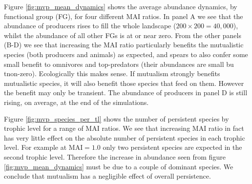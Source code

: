
Figure \ref{fig:mvp_mean_dynamics} shows the average abundance dynamics, by functional group (FG), for four different MAI ratios. In panel A we see that the abundance of producers rises to fill the whole landscape ($200 \times 200=40,000$), whilst the abundance of all other FGs is at or near zero. From the other panels (B-D) we see that increasing the MAI ratio particularly benefits the mutualistic species (both producers and animals) as expected, and spears to also confer some small benefit to omnivores and top-predators (their abundances are small bu tnon-zero). Ecologically this makes sense. If mutualism strongly benefits mutualistic species, it will also benefit those species that feed on them. However the benefit may only be transient. The abundance of producers in panel D is still rising, on average, at the end of the simulations. 



Figure \ref{fig:mvp_species_per_tl} shows the number of persistent species by trophic level for a range of MAI ratios. We see that increasing MAI ratio in fact has very little effect on the absolute number of persistent species in each trophic level. For example at MAI$=1.0$ only two persistent species are expected in the second trophic level. Therefore the increase in abundance seen from figure \ref{fig:mvp_mean_dynamics} must be due to a couple of dominant species. We conclude that mutualism has a negligible effect of overall persistence.

